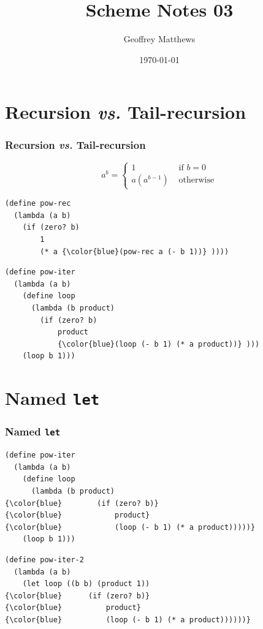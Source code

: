 \documentclass{beamer}
\title
{
Scheme Notes 03
}
\subtitle{
} %
\author[Geoffrey Matthews]
{Geoffrey Matthews}
\institute[WWU/CS]
{
  Department of Computer Science\\
  Western Washington University
}
\date{\today}
\newcommand{\sect}[1]{
\section{#1}
\begin{frame}[fragile]\frametitle{#1}
}
\begin{document}
\begin{frame}
  \titlepage
\end{frame}


\newcommand{\myref}[1]{\small\item\url{#1}}
\newcommand{\myreft}[1]{\footnotesize\item\url{#1}}


\sect{Recursion {\em vs.} Tail-recursion}

\[ a^b = \left\{\begin{array}{ll} 1 & \mbox{ if $b=0$}\\
    a(a^{b-1}) & \mbox{ otherwise}
  \end{array}\right.
  \]

\begin{Verbatim}[commandchars=\\\{\}]
(define pow-rec
  (lambda (a b)
    (if (zero? b) 
        1
        (* a {\color{blue}(pow-rec a (- b 1))} ))))
\end{Verbatim}
\vfill\pause

\begin{Verbatim}[commandchars=\\\{\}]
(define pow-iter
  (lambda (a b)
    (define loop
      (lambda (b product)
        (if (zero? b)
            product
            {\color{blue}(loop (- b 1) (* a product))} )))
    (loop b 1)))
\end{Verbatim}
\end{frame}

\sect{Named {\tt let}}

\begin{Verbatim}[commandchars=\\\{\}]
(define pow-iter
  (lambda (a b)
    (define loop
      (lambda (b product)
{\color{blue}        (if (zero? b)}
{\color{blue}            product}
{\color{blue}            (loop (- b 1) (* a product)))))}
    (loop b 1)))
\end{Verbatim}
\vfill
\begin{Verbatim}[commandchars=\\\{\}]
(define pow-iter-2
  (lambda (a b)
    (let loop ((b b) (product 1))
{\color{blue}      (if (zero? b)}
{\color{blue}          product}
{\color{blue}          (loop (- b 1) (* a product))))))}
\end{Verbatim}
\end{frame}
\end{document}
